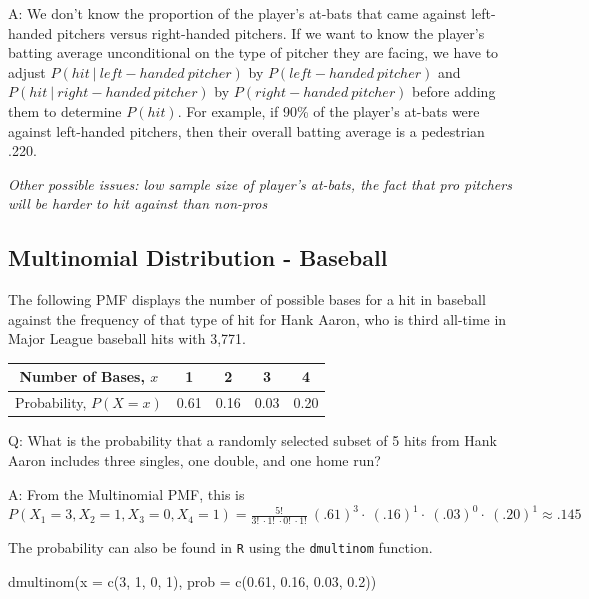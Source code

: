 \documentclass[
  11pt,
]{book}
\newenvironment{Shaded}{\begin{snugshade}}{\end{snugshade}}
\newcommand{\AttributeTok}[1]{\textcolor[rgb]{0.77,0.63,0.00}{#1}}
\newcommand{\DecValTok}[1]{\textcolor[rgb]{0.00,0.00,0.81}{#1}}
\newcommand{\FloatTok}[1]{\textcolor[rgb]{0.00,0.00,0.81}{#1}}
\newcommand{\FunctionTok}[1]{\textcolor[rgb]{0.00,0.00,0.00}{#1}}
\newcommand{\NormalTok}[1]{#1}
\theoremstyle{definition}
\theoremstyle{definition}
\theoremstyle{definition}
\theoremstyle{definition}
\theoremstyle{remark}
\begin{document}
A: We don't know the proportion of the player's at-bats that came against left-handed pitchers versus right-handed pitchers. If we want to know the player's batting average unconditional on the type of pitcher they are facing, we have to adjust \(P(hit\ |\ left-handed\ pitcher)\) by \(P(left-handed\ pitcher)\) and \(P(hit\ |\ right-handed\ pitcher)\) by \(P(right-handed\ pitcher)\) before adding them to determine \(P(hit)\). For example, if 90\% of the player's at-bats were against left-handed pitchers, then their overall batting average is a pedestrian .220.

\emph{Other possible issues: low sample size of player's at-bats, the fact that pro pitchers will be harder to hit against than non-pros}

\hypertarget{multinomial-distribution---baseball}{%
\subsection{Multinomial Distribution - Baseball}\label{multinomial-distribution---baseball}}

The following PMF displays the number of possible bases for a hit in baseball against the frequency of that type of hit for Hank Aaron, who is third all-time in Major League baseball hits with 3,771.

\begin{longtable}[]{@{}ccccc@{}}
\toprule
Number of Bases, \(x\) & 1 & 2 & 3 & 4 \\
\midrule
\endhead
Probability, \(P(X=x)\) & 0.61 & 0.16 & 0.03 & 0.20 \\
\bottomrule
\end{longtable}

Q: What is the probability that a randomly selected subset of 5 hits from Hank Aaron includes three singles, one double, and one home run?

A: From the Multinomial PMF, this is \(P(X_1 = 3, X_2 = 1, X_3 = 0, X_4 = 1) = \frac{5!}{3!\ \cdot 1!\ \cdot 0!\ \cdot 1!}\ (.61)^3\cdot\ (.16)^1\cdot\ (.03)^0\cdot\ (.20)^1 \approx .145\)

The probability can also be found in \texttt{R} using the \texttt{dmultinom} function.

\begin{Shaded}
\begin{Highlighting}[]
\FunctionTok{dmultinom}\NormalTok{(}\AttributeTok{x =} \FunctionTok{c}\NormalTok{(}\DecValTok{3}\NormalTok{, }\DecValTok{1}\NormalTok{, }\DecValTok{0}\NormalTok{, }\DecValTok{1}\NormalTok{), }\AttributeTok{prob =} \FunctionTok{c}\NormalTok{(}\FloatTok{0.61}\NormalTok{, }\FloatTok{0.16}\NormalTok{, }\FloatTok{0.03}\NormalTok{, }\FloatTok{0.2}\NormalTok{))}
\end{Highlighting}
\end{Shaded}
\end{document}
